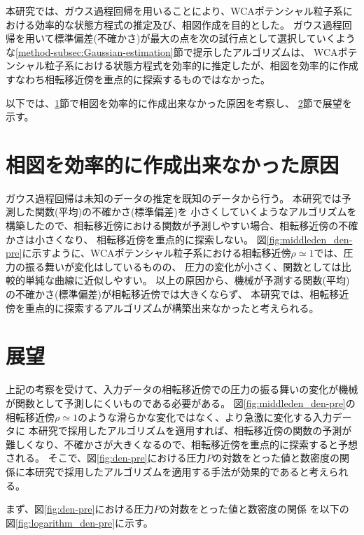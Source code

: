 \documentclass[titlepage]{jsreport}
\begin{document}
{{{本研究では、ガウス過程回帰を用いることにより、WCAポテンシャル粒子系における効率的な状態方程式の推定及び、相図作成を目的とした。
ガウス過程回帰を用いて標準偏差(不確かさ)が最大の点を次の試行点として選択していくような\ref{method-subsec:Gaussian-estimation}節で提示したアルゴリズムは、
WCAポテンシャル粒子系における状態方程式を効率的に推定したが、相図を効率的に作成すなわち相転移近傍を重点的に探索するものではなかった。

以下では、\ref{sum-sec:cause}節で相図を効率的に作成出来なかった原因を考察し、
\ref{sum-sec:outlook}節で展望を示す。


\section{相図を効率的に作成出来なかった原因}\label{sum-sec:cause}
ガウス過程回帰は未知のデータの推定を既知のデータから行う。
本研究では予測した関数(平均)の不確かさ(標準偏差)を
小さくしていくようなアルゴリズムを構築したので、相転移近傍における関数が予測しやすい場合、相転移近傍の不確かさは小さくなり、
相転移近傍を重点的に探索しない。
図\ref{fig:middleden_den-pre}に示すように、WCAポテンシャル粒子系における相転移近傍${\rho}\simeq{1}$では、圧力の振る舞いが変化はしているものの、
圧力の変化が小さく、関数としては比較的単純な曲線に近似しやすい。
以上の原因から、機械が予測する関数(平均)の不確かさ(標準偏差)が相転移近傍では大きくならず、
本研究では、相転移近傍を重点的に探索するアルゴリズムが構築出来なかったと考えられる。

\section{展望}\label{sum-sec:outlook}
上記の考察を受けて、入力データの相転移近傍での圧力の振る舞いの変化が機械が関数として予測しにくいものである必要がある。
図\ref{fig:middleden_den-pre}の相転移近傍${\rho}\simeq{1}$のような滑らかな変化ではなく、より急激に変化する入力データに
本研究で採用したアルゴリズムを適用すれば、相転移近傍の関数の予測が難しくなり、不確かさが大きくなるので、相転移近傍を重点的に探索すると予想される。
そこで、図\ref{fig:den-pre}における圧力$P$の対数をとった値と数密度の関係に本研究で採用したアルゴリズムを適用する手法が効果的であると考えられる。

まず、図\ref{fig:den-pre}における圧力$P$の対数をとった値と数密度の関係
を以下の図\ref{fig:logarithm_den-pre}に示す。

}}}
\end{document}
